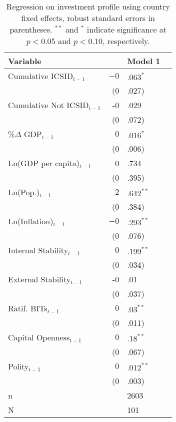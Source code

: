 \begin{table}[ht]
\centering
\begingroup\footnotesize
\begin{tabular}{lr@{}lr@{}}
 Variable && Model 1 \\ 
  \hline
\hline
Cumulative ICSID$_{t-1}$ & $-0$&$.063^{\ast}$ \\ 
   & (0&.027) \\ 
  Cumulative Not ICSID$_{t-1}$ & -0&.029 \\ 
   & (0&.072) \\ 
  \%$\Delta$ GDP$_{t-1}$ & $0$&$.016^{\ast}$ \\ 
   & (0&.006) \\ 
  Ln(GDP per capita)$_{t-1}$ & 0&.734 \\ 
   & (0&.395) \\ 
  Ln(Pop.)$_{t-1}$ & $2$&$.642^{\ast\ast}$ \\ 
   & (0&.384) \\ 
  Ln(Inflation)$_{t-1}$ & $-0$&$.293^{\ast\ast}$ \\ 
   & (0&.076) \\ 
  Internal Stability$_{t-1}$ & $0$&$.199^{\ast\ast}$ \\ 
   & (0&.034) \\ 
  External Stability$_{t-1}$ & -0&.01 \\ 
   & (0&.037) \\ 
  Ratif. BITs$_{t-1}$ & $0$&$.03^{\ast\ast}$ \\ 
   & (0&.011) \\ 
  Capital Openness$_{t-1}$ & $0$&$.18^{\ast\ast}$ \\ 
   & (0&.067) \\ 
  Polity$_{t-1}$ & $0$&$.012^{\ast\ast}$ \\ 
   & (0&.003) \\ 
   \hline
n && 2603 \\ 
  N && 101 \\ 
   \hline
\hline
\end{tabular}
\endgroup
\caption{Regression on investment profile using country fixed effects, robust standard errors in parentheses. $^{**}$ and $^{*}$ indicate significance at $p< 0.05 $ and $p< 0.10 $, respectively.} 
\end{table}
